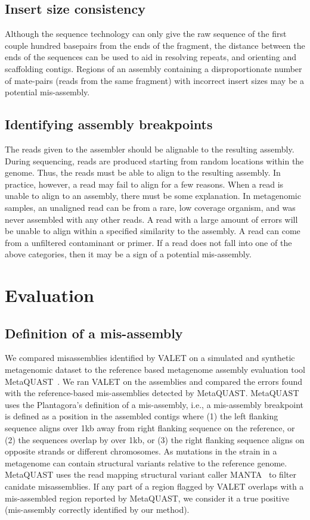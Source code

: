 \documentclass{article}
\begin{document}
\subsection{Insert size consistency}
Although the sequence technology can only give the raw sequence of the first couple hundred basepairs from the ends of the fragment, the distance between the ends of the sequences can be used to aid in resolving repeats, and orienting and scaffolding contigs. 
Regions of an assembly containing a disproportionate number of mate-pairs (reads from the same fragment) with incorrect insert sizes may be a potential mis-assembly.

\subsection{Identifying assembly breakpoints}
The reads given to the assembler should be alignable to the resulting assembly.
During sequencing, reads are produced starting from random locations within the genome.
Thus, the reads must be able to align to the resulting assembly.
In practice, however, a read may fail to align for a few reasons.
When a read is unable to align to an assembly, there must be some explanation.
In metagenomic samples, an unaligned read can be from a rare, low coverage organism, and was never assembled with any other reads.
A read with a large amount of errors will be unable to align within a specified similarity to the assembly.
A read can come from a unfiltered contaminant or primer.
If a read does not fall into one of the above categories, then it may be a sign of a potential mis-assembly.

\section{Evaluation}
\subsection{Definition of a mis-assembly}
We compared misassemblies identified by VALET on a simulated and synthetic metagenomic dataset to the reference based metagenome assembly evaluation tool MetaQUAST~\citep{mikheenko2015metaquast}.
We ran VALET on the assemblies and compared the errors found with the reference-based mis-assemblies detected by MetaQUAST.
MetaQUAST uses the Plantagora’s definition of a mis-assembly,
i.e., a mis-assembly breakpoint is defined as a position in the assembled contigs where (1) the left flanking
sequence aligns over 1kb away from right flanking sequence on the reference, or (2) the sequences overlap by
over 1kb, or (3) the right flanking sequence aligns on opposite strands or different chromosomes. 
As mutations in the strain in a metagenome can contain structural variants relative to the reference genome. 
MetaQUAST uses the read mapping structural variant caller MANTA~\citep{chen2015manta} to filter canidate misassemblies. 
If any part of a region flagged by VALET overlaps with a mis-assembled region reported by MetaQUAST, we consider it a true positive (mis-assembly correctly identified by our method).
\end{document}
